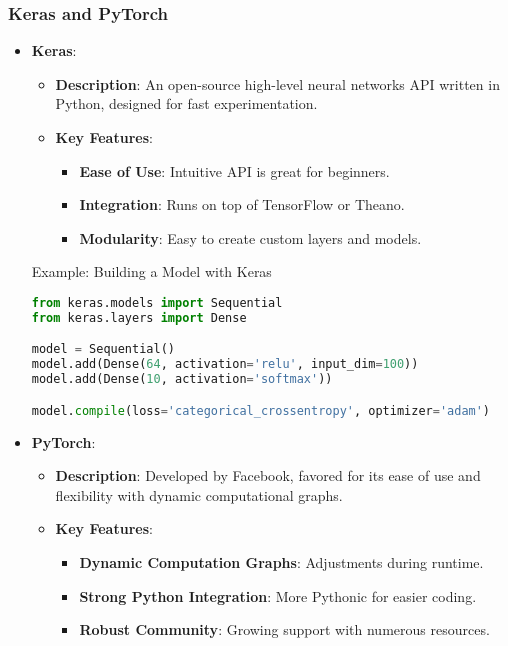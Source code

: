 \documentclass[aspectratio=169]{beamer}
\begin{document}
\begin{frame}[fragile]
    \frametitle{Keras and PyTorch}
    \begin{itemize}
        \item \textbf{Keras}:
            \begin{itemize}
                \item \textbf{Description}: An open-source high-level neural networks API written in Python, designed for fast experimentation.
                \item \textbf{Key Features}:
                    \begin{itemize}
                        \item \textbf{Ease of Use}: Intuitive API is great for beginners.
                        \item \textbf{Integration}: Runs on top of TensorFlow or Theano.
                        \item \textbf{Modularity}: Easy to create custom layers and models.
                    \end{itemize}
            \end{itemize}
        
        \begin{block}{Example: Building a Model with Keras}
            \begin{lstlisting}[language=Python]
from keras.models import Sequential
from keras.layers import Dense

model = Sequential()
model.add(Dense(64, activation='relu', input_dim=100))
model.add(Dense(10, activation='softmax'))

model.compile(loss='categorical_crossentropy', optimizer='adam')
            \end{lstlisting}
        \end{block}

        \item \textbf{PyTorch}:
            \begin{itemize}
                \item \textbf{Description}: Developed by Facebook, favored for its ease of use and flexibility with dynamic computational graphs.
                \item \textbf{Key Features}:
                    \begin{itemize}
                        \item \textbf{Dynamic Computation Graphs}: Adjustments during runtime.
                        \item \textbf{Strong Python Integration}: More Pythonic for easier coding.
                        \item \textbf{Robust Community}: Growing support with numerous resources.
                    \end{itemize}
            \end{itemize}
    \end{itemize}
    

\end{frame}
\end{document}
